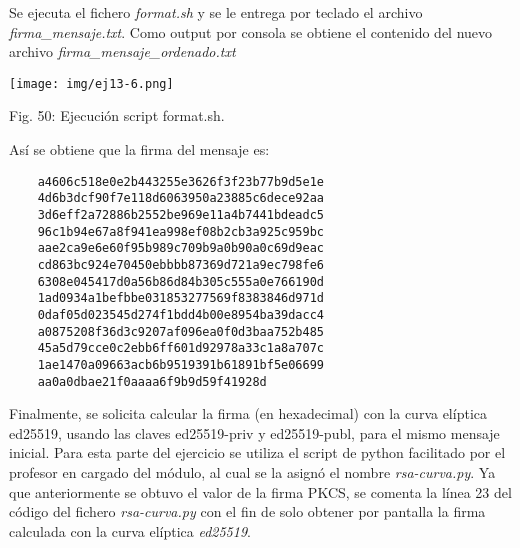 \documentclass[12pt,oneside,a4paper]{book}
\begin{document}
\vspace{2em}

\hspace{20pt}
Se ejecuta el fichero \textit{format.sh} y se le entrega por teclado el archivo \textit{firma\_mensaje.txt}. Como output por consola se obtiene el contenido del nuevo archivo \textit{firma\_mensaje\_ordenado.txt}

\vspace{2em}

\begin{center}
    \texttt{[image: img/ej13-6.png]}
    
\vspace{0.1em}
    
    Fig. 50: Ejecución script format.sh.
\end{center}

\vspace{2em}

\hspace{20pt}
Así se obtiene que la firma del mensaje es:

\begin{verbatim}
    a4606c518e0e2b443255e3626f3f23b77b9d5e1e
    4d6b3dcf90f7e118d6063950a23885c6dece92aa
    3d6eff2a72886b2552be969e11a4b7441bdeadc5
    96c1b94e67a8f941ea998ef08b2cb3a925c959bc
    aae2ca9e6e60f95b989c709b9a0b90a0c69d9eac
    cd863bc924e70450ebbbb87369d721a9ec798fe6
    6308e045417d0a56b86d84b305c555a0e766190d
    1ad0934a1befbbe031853277569f8383846d971d
    0daf05d023545d274f1bdd4b00e8954ba39dacc4
    a0875208f36d3c9207af096ea0f0d3baa752b485
    45a5d79cce0c2ebb6ff601d92978a33c1a8a707c
    1ae1470a09663acb6b9519391b61891bf5e06699
    aa0a0dbae21f0aaaa6f9b9d59f41928d
\end{verbatim}

\vspace{1em}

\hspace{20pt}
Finalmente, se solicita calcular la firma (en hexadecimal) con la curva elíptica ed25519, usando las claves ed25519-priv y ed25519-publ, para el mismo mensaje inicial. Para esta parte del ejercicio se utiliza el script de python facilitado por el profesor en cargado del módulo, al cual se la asignó el nombre \textit{rsa-curva.py}. Ya que anteriormente se obtuvo el valor de la firma PKCS, se comenta la línea 23 del código del fichero \textit{rsa-curva.py} con el fin de solo obtener por pantalla la firma calculada con la curva elíptica \textit{ed25519}.

\vspace{2em}
\end{document}
